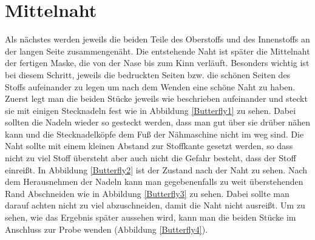 \documentclass[12pt,parskip=full]{scrartcl}
\begin{document}
\section{Mittelnaht}
Als nächstes werden jeweils die beiden Teile des Oberstoffs und des Innenstoffs an der langen Seite zusammengenäht. Die entstehende Naht ist später die Mittelnaht der fertigen Maske, die von der Nase bis zum Kinn verläuft. Besonders wichtig ist bei diesem Schritt, jeweils die bedruckten Seiten bzw. die schönen Seiten des Stoffs aufeinander zu legen um nach dem Wenden eine schöne Naht zu haben. Zuerst legt man die beiden Stücke jeweils wie beschrieben aufeinander und steckt sie mit einigen Stecknadeln fest wie in Abbildung \ref{Butterfly1} zu sehen. Dabei sollten die Nadeln wieder so gesteckt werden, dass man gut über sie drüber nähen kann und die Stecknadelköpfe dem Fuß der Nähmaschine nicht im weg sind. Die Naht sollte mit einem kleinen Abstand zur Stoffkante gesetzt werden, so dass nicht zu viel Stoff übersteht aber auch nicht die Gefahr besteht, dass der Stoff einreißt. In Abbildung \ref{Butterfly2} ist der Zustand nach der Naht zu sehen. Nach dem Herausnehmen der Nadeln kann man gegebenenfalls zu weit überstehenden Rand Abschneiden wie in Abbildung \ref{Butterfly3} zu sehen. Dabei sollte man darauf achten nicht zu viel abzuschneiden, damit die Naht nicht ausreißt. Um zu sehen, wie das Ergebnis später aussehen wird, kann man die beiden Stücke im Anschluss zur Probe wenden (Abbildung \ref{Butterfly4}).
\end{document}
